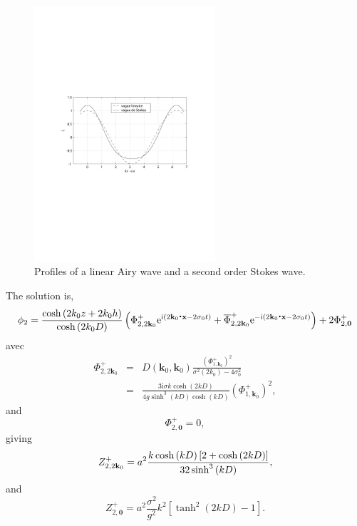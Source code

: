\begin{figure}
\centerline{\includegraphics[width=0.6\textwidth]{FIGS_CH_NONLIN2/stokes.pdf}}
\caption{Profiles of a linear Airy wave and a second order Stokes wave.} \label{stokes}
\end{figure}
The solution is, 
\begin{equation}
    \phi_2=\frac{\cosh\left(2 k_0 z+2 k_0 h\right)}{\cosh\left(2 k_0 D\right)}
    \left(
    \Phi_{2,2 {\mathbf k}_0}^{+}
    \mathrm{e}^{\mathrm{i}\left(2 \mathbf{k}_0\mbox{\boldmath $\cdot$}{\mathbf x}-2 \sigma_0 t\right)}
    +\overline{\Phi}_{2,2 {\mathbf k}_0}^{+}
    \mathrm{e}^{-\mathrm{i}\left(2 \mathbf{k}_0\mbox{\boldmath $\cdot$}{\mathbf x}-2 \sigma_0 t\right)}
      \right)
    +2 \Phi _{2,{\mathbf 0}}^{+}
\end{equation}
avec
\begin{eqnarray}
\Phi_{2,2 {\mathbf k}_0}^{+} & = &
    D\left({\mathbf k}_0,{\mathbf k}_0\right)
        \frac{\left(\Phi_{1,{\mathbf k}_0}^{+} \right)^2}
        {\sigma^2\left(2k_0\right)-4\sigma_0^2} \\
    & =& \frac{3{\mathrm i}\sigma k\cosh\left(2kD\right)}
        {4g\sinh^3\left(kD\right) \cosh\left(kD\right)  }
        \left(\Phi_{1,{\mathbf k}_0}^{+} \right)^2,
\end{eqnarray}
and
\begin{equation}
\Phi_{2,{\mathbf 0}}^{+}  = 0,
\end{equation}
giving
\begin{equation}
    Z_{2,2{\mathbf{k}}_0}^{+}
    = a^2 \frac{k\cosh\left(kD\right)\left[2+\cosh\left(2kD\right)\right]}
        {32 \sinh ^3 \left(kD\right)},
\end{equation}
and
\begin{equation}
    Z_{2,{\mathbf 0}}^{+}
    = a^2 \frac{\sigma^2}{g^2}k^2\left[\tanh^2\left(2kD\right)-1\right].
\end{equation}


